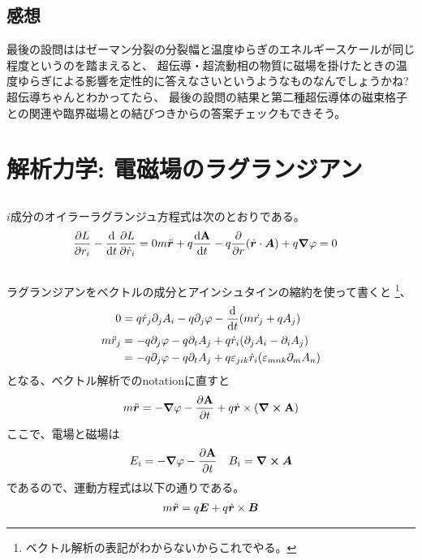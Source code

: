 \documentclass[../../master.tex]{subfiles}
\begin{document}
\subsection*{感想}
最後の設問ははゼーマン分裂の分裂幅と温度ゆらぎのエネルギースケールが同じ程度というのを踏まえると、
超伝導・超流動相の物質に磁場を掛けたときの温度ゆらぎによる影響を定性的に答えなさいというようなものなんでしょうかね?
超伝導ちゃんとわかってたら、
最後の設問の結果と第二種超伝導体の磁束格子との関連や臨界磁場との結びつきからの答案チェックもできそう。

\clearpage
\section{解析力学: 電磁場のラグランジアン}
\subsection{}
\(i\)成分のオイラーラグランジュ方程式は次のとおりである。
\begin{align*}
    \pdv{L}{r_i}-\dv{t}\pdv{L}{\dot{r}_i}&=0
    m\ddot{\vb*{r}}+q\dv{\vb{A}}{t} - q\pdv{r}\qty(\dot{\vb*{r}}\cdot \vb*{A}) + q\grad{\varphi}=0
\end{align*}


\subsection{}
ラグランジアンをベクトルの成分とアインシュタインの縮約を使って書くと
\footnote{ベクトル解析の表記がわからないからこれでやる。}、
\begin{equation}\begin{aligned}[b]
    0&= q \dot{r}_j \partial_j A_i - q \partial_j \varphi-\dv{t}\qty(
        m\dot{r_j}+qA_j)\\
    m\ddot{r}_j &= -q\partial_j\varphi-q\partial_t A_j + q\dot{r}_i\qty(\partial_jA_i-\partial_i A_j)\\
    &= -q\partial_j\varphi-q\partial_t A_j + q\varepsilon_{jik}\dot{r}_i\qty(\varepsilon_{mnk}\partial_mA_n)
\end{aligned}\end{equation}
となる、ベクトル解析でのnotationに直すと
\begin{equation}\begin{aligned}[b]
    m\ddot{\vb*{r}} = -\grad \varphi - \pdv{\vb{A}}{t} + q \dot{\vb*{r}}\times \qty(\curl \vb{A})
\end{aligned}\end{equation}
ここで、電場と磁場は
\begin{equation}\begin{aligned}[b]
    E_i &= -\grad \varphi - \pdv{\vb{A}}{t}  & B_i = \curl \vb*{A}
\end{aligned}\end{equation}
であるので、運動方程式は以下の通りである。
\begin{equation}\begin{aligned}[b]
    m\ddot{\vb*{r}} = q \vb*{E} +q\dot{\vb*{r}}\times \vb*{B}
\end{aligned}\end{equation}
\end{document}
